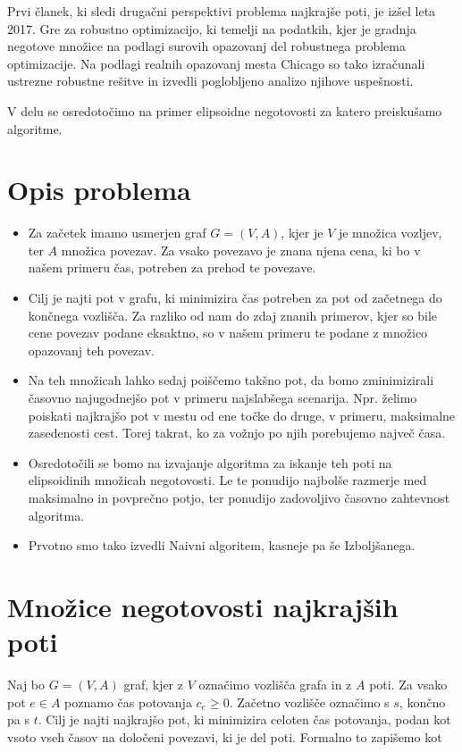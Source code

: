 \documentclass[a4paper, 12 pt]{article}
\theoremstyle{definition} %
\theoremstyle{plain} %
\theoremstyle{definition}
\begin{document}
Prvi članek, ki sledi drugačni perspektivi problema najkrajše poti, je izšel leta 2017. Gre za robustno optimizacijo, ki temelji na podatkih, kjer je gradnja negotove množice na podlagi surovih opazovanj del robustnega problema optimizacije. Na podlagi realnih opazovanj mesta Chicago so tako izračunali ustrezne robustne rešitve in izvedli poglobljeno analizo njihove uspešnosti. \newline

V delu se osredotočimo na primer elipsoidne negotovosti za katero preiskušamo algoritme. 


\section{Opis problema}
\begin{itemize}
\item{Za začetek imamo usmerjen graf $ G = (V, A)$, kjer je $V$ je množica vozljev, ter $A$ množica povezav. Za vsako povezavo je znana njena cena, ki bo v našem primeru čas, potreben za prehod te povezave.}
\item{Cilj je najti pot v grafu, ki minimizira čas potreben za pot od začetnega do končnega vozlišča. Za razliko od nam do zdaj znanih primerov, kjer so bile cene povezav podane eksaktno, so v našem primeru te podane z množico opazovanj teh povezav.}
\item{Na teh množicah lahko sedaj poiščemo takšno pot, da bomo zminimizirali časovno najugodnejšo pot v primeru najslabšega scenarija. Npr. želimo poiskati najkrajšo pot v mestu od ene točke do druge, v primeru, maksimalne zasedenosti cest. Torej takrat, ko za vožnjo po njih porebujemo največ časa.}
\item{Osredotočili se bomo na izvajanje algoritma za iskanje teh poti na elipsoidinih množicah negotovosti. Le te ponudijo najbolše razmerje med maksimalno in povprečno potjo, ter ponudijo zadovoljivo časovno zahtevnost algoritma.}
\item{Prvotno smo tako izvedli Naivni algoritem, kasneje pa še Izboljšanega.}
\end{itemize}


\section{Množice negotovosti najkrajših poti}

Naj bo $G = (V, A)$ graf, kjer z $V$ označimo vozlišča grafa in z $A$ poti. Za vsako pot $e\in A$ poznamo čas potovanja $c_{e} \ge 0$. Začetno vozlišče označimo s $s$, končno pa s $t$.
Cilj je najti najkrajšo pot, ki minimizira celoten čas potovanja, podan kot vsoto vseh časov na določeni povezavi, ki je del poti. Formalno to zapišemo kot
\end{document}
